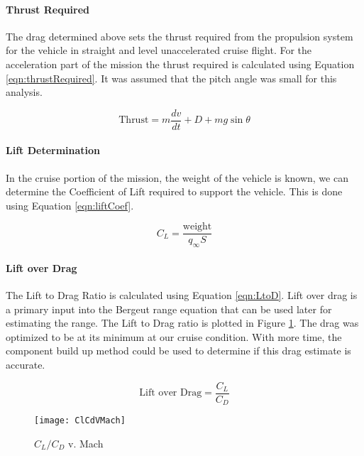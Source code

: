 \paragraph{Thrust Required}
The drag determined above sets the thrust required from the propulsion system for the vehicle in straight and level unaccelerated cruise flight.
For the acceleration part of the mission the thrust required is calculated using Equation \ref{eqn:thrustRequired}. It was assumed that the pitch angle was small for this analysis.

\begin{equation}
\label{eqn:thrustRequired}
\text{Thrust}=m\frac{dv}{dt}+D+mg\sin{\theta}
\end{equation}

\paragraph{Lift Determination}
In the cruise portion of the mission, the weight of the vehicle is known, we can determine the Coefficient of Lift required to support the vehicle. This is done using Equation \ref{eqn:liftCoef}.

\begin{equation}
\label{eqn:liftCoef}
C_L=\frac{\text{weight}}{q_{\infty}S}
\end{equation}

\paragraph{Lift over Drag}
The Lift to Drag Ratio is calculated using Equation \ref{eqn:LtoD}. Lift over drag is a primary input into the Bergeut range equation that can be used later for estimating the range. The Lift to Drag ratio is plotted in Figure \ref{fig:ClCdVMach}. The drag was optimized to be at its minimum at our cruise condition. With more time, the component build up method could be used to determine if this drag estimate is accurate.

\begin{equation}
\label{eqn:LtoD}
\text{Lift over Drag} = \frac{C_L}{C_D}
\end{equation}

\begin{figure}[H]
\begin{center}
\texttt{[image: ClCdVMach]}
\caption{$C_L/C_D$ v. Mach}
\label{fig:ClCdVMach}
\end{center}
\end{figure}